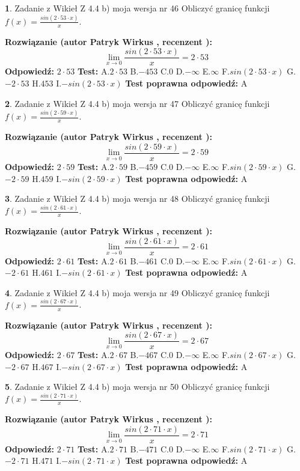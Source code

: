 \documentclass[12pt, a4paper]{article}
\theoremstyle{definition} %
\newtheorem{zad}{}
\newcommand{\zadStart}[1]{\begin{zad}#1\newline}
\newcommand{\zadStop}{\end{zad}}
\newcommand{\rozwStart}[2]{\noindent \textbf{Rozwiązanie (autor #1 , recenzent #2): }\newline}
\newcommand{\rozwStop}{\newline}
\newcommand{\odpStart}{\noindent \textbf{Odpowiedź:}\newline}
\newcommand{\odpStop}{\newline}
\newcommand{\testStart}{\noindent \textbf{Test:}\newline}
\newcommand{\testStop}{\newline}
\newcommand{\kluczStart}{\noindent \textbf{Test poprawna odpowiedź:}\newline}
\newcommand{\kluczStop}{\newline}
\begin{document}
\zadStart{Zadanie z Wikieł Z 4.4 b) moja wersja nr 46}
Obliczyć granicę funkcji $f(x)=\frac{sin(2 \cdot53\cdot x)}{x}$.
\zadStop
\rozwStart{Patryk Wirkus}{}
$$\lim\limits_{x\to 0}\frac{sin(2 \cdot 53\cdot x)}{x}=
2 \cdot 53$$
\rozwStop
\odpStart
$2 \cdot 53$
\odpStop
\testStart
A.$2 \cdot 53$
B.$-453$
C.$0$
D.$-\infty$
E.$\infty$
F.$sin(2 \cdot 53\cdot x)$
G.$-2 \cdot 53$
H.$453$
I.$-sin(2 \cdot 53\cdot x)$
\testStop
\kluczStart
A
\kluczStop



\zadStart{Zadanie z Wikieł Z 4.4 b) moja wersja nr 47}
Obliczyć granicę funkcji $f(x)=\frac{sin(2 \cdot59\cdot x)}{x}$.
\zadStop
\rozwStart{Patryk Wirkus}{}
$$\lim\limits_{x\to 0}\frac{sin(2 \cdot 59\cdot x)}{x}=
2 \cdot 59$$
\rozwStop
\odpStart
$2 \cdot 59$
\odpStop
\testStart
A.$2 \cdot 59$
B.$-459$
C.$0$
D.$-\infty$
E.$\infty$
F.$sin(2 \cdot 59\cdot x)$
G.$-2 \cdot 59$
H.$459$
I.$-sin(2 \cdot 59\cdot x)$
\testStop
\kluczStart
A
\kluczStop



\zadStart{Zadanie z Wikieł Z 4.4 b) moja wersja nr 48}
Obliczyć granicę funkcji $f(x)=\frac{sin(2 \cdot61\cdot x)}{x}$.
\zadStop
\rozwStart{Patryk Wirkus}{}
$$\lim\limits_{x\to 0}\frac{sin(2 \cdot 61\cdot x)}{x}=
2 \cdot 61$$
\rozwStop
\odpStart
$2 \cdot 61$
\odpStop
\testStart
A.$2 \cdot 61$
B.$-461$
C.$0$
D.$-\infty$
E.$\infty$
F.$sin(2 \cdot 61\cdot x)$
G.$-2 \cdot 61$
H.$461$
I.$-sin(2 \cdot 61\cdot x)$
\testStop
\kluczStart
A
\kluczStop



\zadStart{Zadanie z Wikieł Z 4.4 b) moja wersja nr 49}
Obliczyć granicę funkcji $f(x)=\frac{sin(2 \cdot67\cdot x)}{x}$.
\zadStop
\rozwStart{Patryk Wirkus}{}
$$\lim\limits_{x\to 0}\frac{sin(2 \cdot 67\cdot x)}{x}=
2 \cdot 67$$
\rozwStop
\odpStart
$2 \cdot 67$
\odpStop
\testStart
A.$2 \cdot 67$
B.$-467$
C.$0$
D.$-\infty$
E.$\infty$
F.$sin(2 \cdot 67\cdot x)$
G.$-2 \cdot 67$
H.$467$
I.$-sin(2 \cdot 67\cdot x)$
\testStop
\kluczStart
A
\kluczStop



\zadStart{Zadanie z Wikieł Z 4.4 b) moja wersja nr 50}
Obliczyć granicę funkcji $f(x)=\frac{sin(2 \cdot71\cdot x)}{x}$.
\zadStop
\rozwStart{Patryk Wirkus}{}
$$\lim\limits_{x\to 0}\frac{sin(2 \cdot 71\cdot x)}{x}=
2 \cdot 71$$
\rozwStop
\odpStart
$2 \cdot 71$
\odpStop
\testStart
A.$2 \cdot 71$
B.$-471$
C.$0$
D.$-\infty$
E.$\infty$
F.$sin(2 \cdot 71\cdot x)$
G.$-2 \cdot 71$
H.$471$
I.$-sin(2 \cdot 71\cdot x)$
\testStop
\kluczStart
A
\kluczStop
\end{document}
